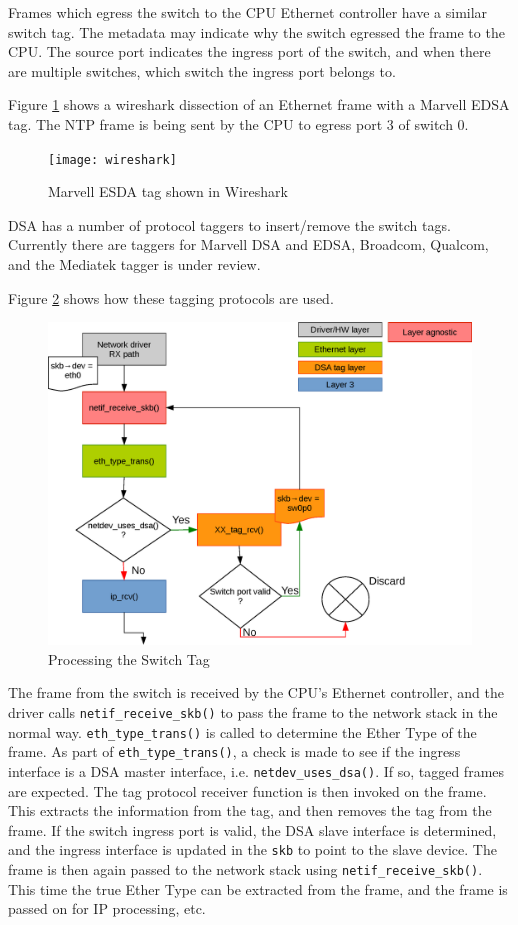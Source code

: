 \documentclass[letterpaper]{article}
\begin{document}
Frames which egress the switch to the CPU Ethernet controller have a
similar switch tag. The metadata may indicate why the switch egressed
the frame to the CPU. The source port indicates the ingress port of
the switch, and when there are multiple switches, which switch the
ingress port belongs to.

Figure \ref{wireshark} shows a wireshark dissection of an Ethernet
frame with a Marvell EDSA tag. The NTP frame is being sent by the CPU
to egress port 3 of switch 0.

\begin{figure}[ht]
  \centering
  \texttt{[image: wireshark]}
  \caption{Marvell ESDA tag shown in Wireshark}
  \label{wireshark}
\end{figure}

DSA has a number of protocol taggers to insert/remove the switch
tags. Currently there are taggers for Marvell DSA and EDSA, Broadcom,
Qualcom, and the Mediatek tagger is under review.

Figure \ref{stackflow} shows how these tagging protocols are used.

\begin{figure}[ht]
  \centering
  \includegraphics[width=\columnwidth]{dsa_explained.eps}
  \caption{Processing the Switch Tag}
  \label{stackflow}
\end{figure}

The frame from the switch is received by the CPU's Ethernet controller,
and the driver calls \verb|netif_receive_skb()| to pass the frame to
the network stack in the normal way. \verb|eth_type_trans()| is called
to determine the Ether Type of the frame. As part of
\verb|eth_type_trans()|, a check is made to see if the ingress
interface is a DSA master interface, i.e. \verb|netdev_uses_dsa()|. If
so, tagged frames are expected. The tag protocol receiver function is
then invoked on the frame. This extracts the information from the tag,
and then removes the tag from the frame. If the switch ingress port is
valid, the DSA slave interface is determined, and the ingress
interface is updated in the \verb|skb| to point to the slave
device. The frame is then again passed to the network stack using
\verb|netif_receive_skb()|. This time the true Ether Type can be
extracted from the frame, and the frame is passed on for IP
processing, etc.
\end{document}
